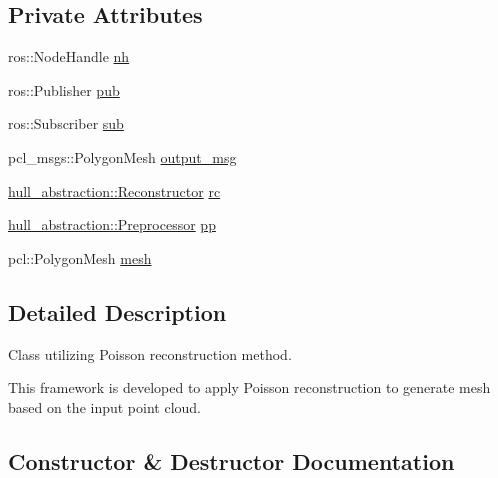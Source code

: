 \subsection*{Private Attributes}
\begin{DoxyCompactItemize}
\item 
ros\+::\+Node\+Handle \hyperlink{classpoisson__reconstruction_1_1_poisson_reconstruction_ac18f4bd8c54335edb4c9154eed871ba5}{nh}
\item 
ros\+::\+Publisher \hyperlink{classpoisson__reconstruction_1_1_poisson_reconstruction_ad327638b4ca620ad0eebc8c9ba2f0dc5}{pub}
\item 
ros\+::\+Subscriber \hyperlink{classpoisson__reconstruction_1_1_poisson_reconstruction_a35abf57328b8f673fa0d0631378d8f19}{sub}
\item 
pcl\+\_\+msgs\+::\+Polygon\+Mesh \hyperlink{classpoisson__reconstruction_1_1_poisson_reconstruction_a10b2bb1e30658337e0780210acda450c}{output\+\_\+msg}
\item 
\hyperlink{classhull__abstraction_1_1_reconstructor}{hull\+\_\+abstraction\+::\+Reconstructor} \hyperlink{classpoisson__reconstruction_1_1_poisson_reconstruction_a2afb3b38fc52d7d8a0ef3e9a4d65027b}{rc}
\item 
\hyperlink{classhull__abstraction_1_1_preprocessor}{hull\+\_\+abstraction\+::\+Preprocessor} \hyperlink{classpoisson__reconstruction_1_1_poisson_reconstruction_a9229da88237b26a663a94c1aca3ceb52}{pp}
\item 
pcl\+::\+Polygon\+Mesh \hyperlink{classpoisson__reconstruction_1_1_poisson_reconstruction_a5815143b0a1d9bb5cbeeddff37564011}{mesh}
\end{DoxyCompactItemize}


\subsection{Detailed Description}
Class utilizing Poisson reconstruction method. 

This framework is developed to apply Poisson reconstruction to generate mesh based on the input point cloud. 

\subsection{Constructor \& Destructor Documentation}
